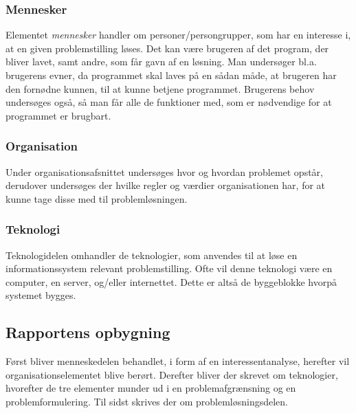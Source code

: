 \subsubsection{Mennesker}\label{subsubsec:mennesker}

Elementet \textit{mennesker} handler om personer/persongrupper, som har en interesse i, at en given
problemstilling løses. Det kan være brugeren af det program, der bliver lavet, samt andre, som får gavn af en
løsning. Man undersøger bl.a. brugerens evner, da programmet skal laves på en sådan måde, at brugeren har den
fornødne kunnen, til at kunne betjene programmet. Brugerens behov undersøges også, så man får alle de
funktioner med, som er nødvendige for at programmet er brugbart.


\subsubsection{Organisation}\label{subsubsec:organisation}

Under organisationsafsnittet undersøges hvor og hvordan problemet opstår, derudover undersøges der hvilke
regler og værdier organisationen har, for at kunne tage disse med til problemløsningen.


\cbstart
\subsubsection{Teknologi}\label{subsubsec:Teknologi}

Teknologidelen omhandler de teknologier, som anvendes til at løse en informationssystem relevant
problemstilling.  Ofte vil denne teknologi være en computer,
en server, og/eller internettet. Dette er altså de byggeblokke hvorpå systemet bygges.
\cbend



\subsection{Rapportens opbygning}\label{subsec:rapportens-opbygning}

Først bliver menneskedelen behandlet, i form af en interessentanalyse, herefter vil organisationselementet
blive berørt. Derefter bliver der skrevet om teknologier, hvorefter de tre elementer munder ud i en
problemafgrænsning og en problemformulering. Til sidst skrives der om problemløsningsdelen. 
